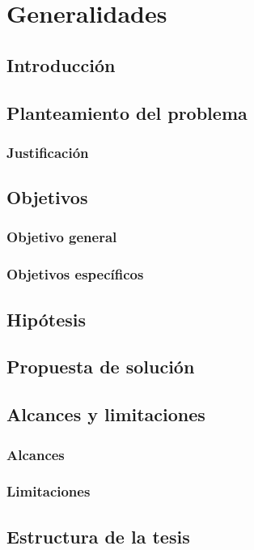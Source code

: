 \chapter{Generalidades}

\section{Introducción}

\section{Planteamiento del problema}

\subsection{Justificación}

\section{Objetivos}
\subsection{Objetivo general}
\subsection{Objetivos específicos}

\section{Hipótesis}

\section{Propuesta de solución}

\section{Alcances y limitaciones}
\subsection{Alcances}
\subsection{Limitaciones}

\section{Estructura de la tesis}
